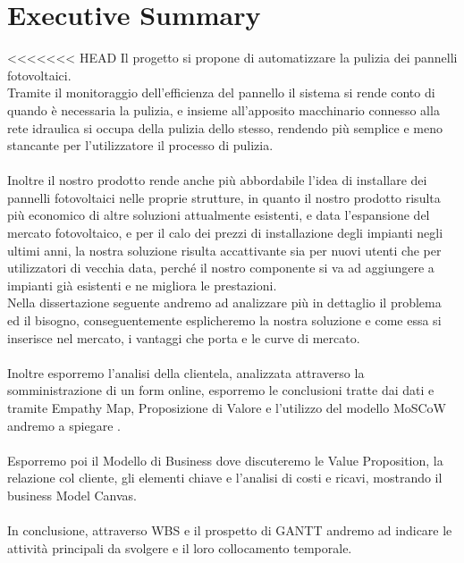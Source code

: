 \documentclass[a4paper, 12pt]{article}
\begin{document}
	\section{Executive Summary} %
<<<<<<< HEAD
	Il progetto si propone di automatizzare la pulizia dei pannelli fotovoltaici.\\
	Tramite il monitoraggio dell'efficienza del pannello il sistema si rende conto di quando è necessaria la pulizia, e insieme all'apposito macchinario connesso alla rete idraulica si occupa della pulizia dello stesso, rendendo più semplice e meno stancante per l'utilizzatore il processo di pulizia.\\\\
	Inoltre il nostro prodotto rende anche più abbordabile l'idea di installare dei pannelli fotovoltaici nelle proprie strutture, in quanto il nostro prodotto risulta più economico di altre soluzioni attualmente esistenti, e data l'espansione del mercato fotovoltaico, e per il calo dei prezzi di installazione degli impianti negli ultimi anni, la nostra soluzione risulta accattivante sia per nuovi utenti che per utilizzatori di vecchia data, perché il nostro componente si va ad aggiungere a impianti già esistenti e ne migliora le prestazioni. \\
	Nella dissertazione seguente andremo ad analizzare più in dettaglio il problema ed il bisogno, conseguentemente esplicheremo la nostra soluzione e come essa si inserisce nel mercato, i vantaggi che porta e le curve di mercato.\\
	\\
	Inoltre esporremo l'analisi della clientela, analizzata attraverso la somministrazione di un form online, %
	 esporremo le conclusioni tratte dai dati e tramite Empathy Map, Proposizione di Valore e l'utilizzo del modello MoSCoW andremo a spiegare %
	 . \\\\
	 Esporremo poi il Modello di Business dove discuteremo le Value Proposition, la relazione col cliente, gli elementi chiave e l'analisi di costi e ricavi, mostrando il business Model Canvas.
	\\\\
	In conclusione, attraverso WBS e il prospetto di GANTT andremo ad indicare le attività principali da svolgere e il loro collocamento temporale.
	
\end{document}
